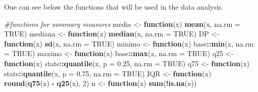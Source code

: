 \documentclass[
]{article}
\newenvironment{Shaded}{\begin{snugshade}}{\end{snugshade}}
\newcommand{\CommentTok}[1]{\textcolor[rgb]{0.56,0.35,0.01}{\textit{#1}}}
\newcommand{\ControlFlowTok}[1]{\textcolor[rgb]{0.13,0.29,0.53}{\textbf{#1}}}
\newcommand{\DataTypeTok}[1]{\textcolor[rgb]{0.13,0.29,0.53}{#1}}
\newcommand{\DecValTok}[1]{\textcolor[rgb]{0.00,0.00,0.81}{#1}}
\newcommand{\FloatTok}[1]{\textcolor[rgb]{0.00,0.00,0.81}{#1}}
\newcommand{\KeywordTok}[1]{\textcolor[rgb]{0.13,0.29,0.53}{\textbf{#1}}}
\newcommand{\NormalTok}[1]{#1}
\newcommand{\OperatorTok}[1]{\textcolor[rgb]{0.81,0.36,0.00}{\textbf{#1}}}
\newcommand{\OtherTok}[1]{\textcolor[rgb]{0.56,0.35,0.01}{#1}}
\newcommand{\StringTok}[1]{\textcolor[rgb]{0.31,0.60,0.02}{#1}}
\begin{document}
One can see below the functions that will be used in the data analysis.

\begin{Shaded}
\begin{Highlighting}[]
\CommentTok{#functions for summary measures}
\NormalTok{media <-}\StringTok{ }\ControlFlowTok{function}\NormalTok{(x)}
  \KeywordTok{mean}\NormalTok{(x, }\DataTypeTok{na.rm =} \OtherTok{TRUE}\NormalTok{)}
\NormalTok{mediana <-}\StringTok{ }\ControlFlowTok{function}\NormalTok{(x)}
  \KeywordTok{median}\NormalTok{(x, }\DataTypeTok{na.rm =} \OtherTok{TRUE}\NormalTok{)}
\NormalTok{DP <-}\StringTok{ }\ControlFlowTok{function}\NormalTok{(x)}
  \KeywordTok{sd}\NormalTok{(x, }\DataTypeTok{na.rm =} \OtherTok{TRUE}\NormalTok{)}
\NormalTok{minimo <-}\StringTok{ }\ControlFlowTok{function}\NormalTok{(x)}
\NormalTok{  base}\OperatorTok{::}\KeywordTok{min}\NormalTok{(x, }\DataTypeTok{na.rm =} \OtherTok{TRUE}\NormalTok{)}
\NormalTok{maximo <-}\StringTok{ }\ControlFlowTok{function}\NormalTok{(x)}
\NormalTok{  base}\OperatorTok{::}\KeywordTok{max}\NormalTok{(x, }\DataTypeTok{na.rm =} \OtherTok{TRUE}\NormalTok{)}
\NormalTok{q25 <-}\StringTok{ }\ControlFlowTok{function}\NormalTok{(x)}
\NormalTok{  stats}\OperatorTok{::}\KeywordTok{quantile}\NormalTok{(x, }\DataTypeTok{p =} \FloatTok{0.25}\NormalTok{, }\DataTypeTok{na.rm =} \OtherTok{TRUE}\NormalTok{)}
\NormalTok{q75 <-}\StringTok{ }\ControlFlowTok{function}\NormalTok{(x)}
\NormalTok{  stats}\OperatorTok{::}\KeywordTok{quantile}\NormalTok{(x, }\DataTypeTok{p =} \FloatTok{0.75}\NormalTok{, }\DataTypeTok{na.rm =} \OtherTok{TRUE}\NormalTok{)}
\NormalTok{IQR <-}\StringTok{ }\ControlFlowTok{function}\NormalTok{(x)}
  \KeywordTok{round}\NormalTok{(}\KeywordTok{q75}\NormalTok{(x) }\OperatorTok{-}\StringTok{ }\KeywordTok{q25}\NormalTok{(x), }\DecValTok{2}\NormalTok{)}
\NormalTok{n <-}\StringTok{ }\ControlFlowTok{function}\NormalTok{(x)}
  \KeywordTok{sum}\NormalTok{(}\OperatorTok{!}\KeywordTok{is.na}\NormalTok{(x))}
\end{Highlighting}
\end{Shaded}
\end{document}
